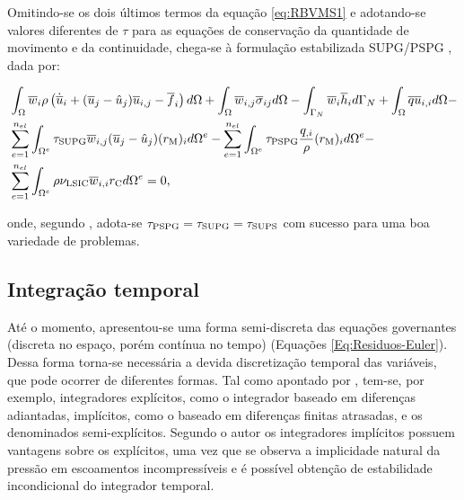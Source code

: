 Omitindo-se os dois últimos termos da equação \eqref{eq:RBVMS1} e adotando-se valores diferentes de $\tau$ para as equações de conservação da quantidade de movimento e da continuidade, chega-se à formulação estabilizada SUPG/PSPG \cite{tezduyar2000finite,tezduyar2003computation,catabriga2005compressible,catabriga2006compressible}, dada por:

\begin{equation}
    \begin{split}
        &\int_{\Omega}{\overline{w}_i\rho\left({\dot{\overline{u}}_i+(\overline{u}_j-\hat{u}_j)\overline{u}_{i,j}-\overline{f}_i}\right) d\Omega}+\int_{\Omega}{\overline{w}_{i,j}\overline{\sigma}_{ij} d\Omega}-\int_{\Gamma_N}{\overline{w}_i\overline{h}_i d\Gamma_N}+\int_{\Omega}{\overline{q}\overline{u}_{i,i} d\Omega}-\\
        &\sum_{e=1}^{n_{el}}{\int_{\Omega^e}{\tau_{\mathrm{SUPG}}\overline{w}_{i,j}(\overline{u}_j-\hat{u}_j)(r_\mathrm{M})_{i} d\Omega^e}}-\sum_{e=1}^{n_{el}}{\int_{\Omega^e}{\tau_{\mathrm{PSPG}}\frac{q_{,i}}{\rho}(r_\mathrm{M})_{i} d\Omega^e}}-\\
        &\sum_{e=1}^{n_{el}}{\int_{\Omega^e}{\rho\nu_{\mathrm{LSIC}}\overline{w}_{i,i}r_\mathrm{C} d\Omega^e}}=0
        \text{,}
        \label{eq:SUPG-PSPG}
    \end{split}
\end{equation}

\noindent onde, segundo , adota-se $\tau_{\mathrm{PSPG}}=\tau_{\mathrm{SUPG}}=\tau_{\mathrm{SUPS}}$ com sucesso para uma boa variedade de problemas.

\subsection{Integração temporal} \label{IT-VMS}

Até o momento, apresentou-se uma forma semi-discreta das equações governantes (discreta no espaço, porém contínua no tempo) (Equações \eqref{Eq:Residuos-Euler}). Dessa forma torna-se necessária a devida discretização temporal das variáveis, que pode ocorrer de diferentes formas. Tal como apontado por , tem-se, por exemplo, integradores explícitos, como o integrador baseado em diferenças adiantadas, implícitos, como o baseado em diferenças finitas atrasadas, e os denominados semi-explícitos. Segundo o autor os integradores implícitos possuem vantagens sobre os explícitos, uma vez que se observa a implicidade natural da pressão em escoamentos incompressíveis e é possível obtenção de estabilidade incondicional do integrador temporal.

